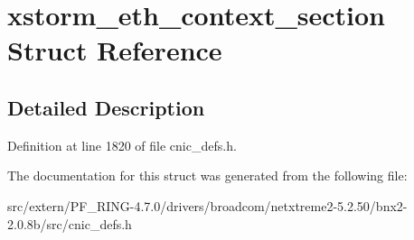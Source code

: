 \hypertarget{structxstorm__eth__context__section}{
\section{xstorm\_\-eth\_\-context\_\-section Struct Reference}
\label{structxstorm__eth__context__section}
}


\subsection{Detailed Description}


Definition at line 1820 of file cnic\_\-defs.h.



The documentation for this struct was generated from the following file:\begin{DoxyCompactItemize}
\item 
src/extern/PF\_\-RING-\/4.7.0/drivers/broadcom/netxtreme2-\/5.2.50/bnx2-\/2.0.8b/src/cnic\_\-defs.h\end{DoxyCompactItemize}
